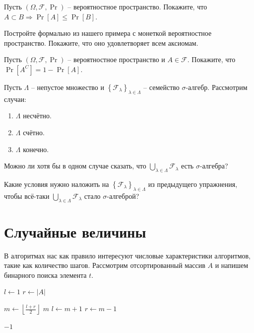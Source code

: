 \Exe Пусть $(\Omega, \mathcal{F}, \Pr)$ -- вероятностное пространство. Покажите, что $A \subset B \Rightarrow \Pr[A] \leq \Pr[B]$.

\Exe Постройте формально из нашего примера с монеткой вероятностное пространство. Покажите, что оно удовлетворяет всем аксиомам.

\Exe Пусть $(\Omega, \mathcal{F}, \Pr)$ -- вероятностное пространство и $A \in \mathcal{F}$. Покажите, что $\Pr\left[A^C\right] = 1 - \Pr[A]$.

\Exe Пусть $\Lambda$ -- непустое множество и $\left\{ \mathcal{F}_\lambda \right\}_{\lambda \in \Lambda}$ -- семейство $\sigma$-алгебр. Рассмотрим случаи:
\begin{enumerate}
    \item $\Lambda$ несчётно. 
    \item $\Lambda$ счётно.
    \item $\Lambda$ конечно.
\end{enumerate}
Можно ли хотя бы в одном случае сказать, что $\bigcup\limits_{\lambda \in \Lambda} \mathcal{F}_\lambda$ есть $\sigma$-алгебра?

\Exe Какие условия нужно наложить на $\left\{ \mathcal{F}_\lambda \right\}_{\lambda \in \Lambda}$ из предыдущего упражнения, чтобы всё-таки $\bigcup\limits_{\lambda \in \Lambda} \mathcal{F}_\lambda$ стало $\sigma$-алгеброй?

\section{Случайные величины}
\label{sec:random-variables}

В алгоритмах нас как правило интересуют числовые характеристики алгоритмов, такие как количество шагов. Рассмотрим отсортированный массив $A$ и напишем бинарного поиска элемента $t$.


\begin{algorithm}[H]
\caption{Бинарный поиск}
\begin{algorithmic}[1]

    \State $l \gets 1$
    \State $r \gets |A|$

        \State $m \gets \left\lfloor\frac{l + r}{2}\right\rfloor$
            \State \Return $m$
            \State $l \gets m + 1$
        \Else
            \State $r \gets m - 1$
        \EndIf
    \EndWhile

    \State \Return $-1$

\EndFunction
\end{algorithmic}
\end{algorithm}

